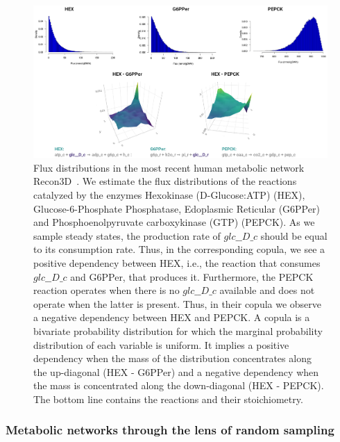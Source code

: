    \begin{figure}[h]
      \centering
      \includegraphics[width=125mm]{figures/copulas_cropped.png}
      \caption[Flux distributions in the most recent human metabolic network Recon3D]{
         Flux distributions in the most recent human metabolic network Recon3D~\cite{brunk2018recon3d}. 
         We estimate the flux distributions of the reactions catalyzed by the enzymes Hexokinase (D-Glucose:ATP) (HEX), Glucose-6-Phosphate Phosphatase, Edoplasmic Reticular (G6PPer)
         and Phosphoenolpyruvate carboxykinase (GTP) (PEPCK).
         As we sample steady states, the production rate of $glc\_\_D \_c$ should be equal to its consumption rate. 
         Thus, in the corresponding copula, we see a positive dependency between HEX,
         i.e., the reaction that consumes $glc\_\_D \_c$ and G6PPer, that produces it.
         Furthermore, the PEPCK reaction operates when there is no $glc\_\_D\_c$ available and does not operate when the latter is present.
         Thus, in their copula we observe a negative dependency between HEX and PEPCK.
         A copula is a bivariate probability distribution for which the marginal probability distribution of each variable is uniform.
         It implies a positive dependency when the mass of the distribution concentrates along the up-diagonal (HEX - G6PPer)
         and a negative dependency when the mass is concentrated along the down-diagonal (HEX - PEPCK). %
         The bottom line contains the  reactions and their stoichiometry.
      }
      \label{fig:copulas}
   \end{figure}


   \subsubsection*{Metabolic networks through the lens of random sampling} 
   \label{subsec:previous_work}

